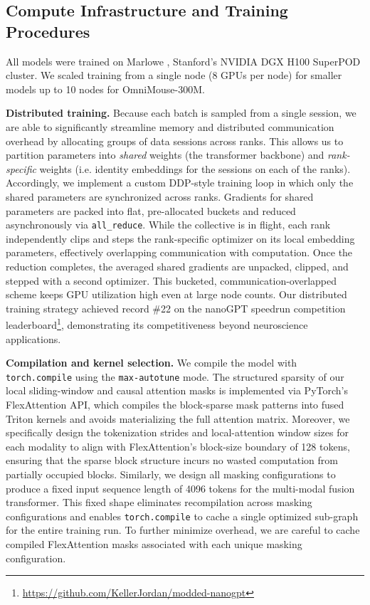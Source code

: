 \documentclass{article} %
\begin{document}

\subsection{Compute Infrastructure and Training Procedures}
\label{sec:appendix_compute}

All models were trained on Marlowe \citep{Marlowe}, Stanford's NVIDIA DGX H100 SuperPOD cluster. We scaled training from a single node (8 GPUs per node) for smaller models up to 10 nodes for OmniMouse-300M.

\textbf{Distributed training.}
Because each batch is sampled from a single session, we are able to significantly streamline memory and distributed communication overhead by allocating groups of data sessions across ranks. This allows us to partition parameters into \textit{shared} weights (the transformer backbone) and \textit{rank-specific} weights (i.e. identity embeddings for the sessions on each of the ranks). Accordingly, we implement a custom DDP-style training loop in which only the shared parameters are synchronized across ranks. Gradients for shared parameters are packed into flat, pre-allocated buckets and reduced asynchronously via \texttt{all\_reduce}. While the collective is in flight, each rank independently clips and steps the rank-specific optimizer on its local embedding parameters, effectively overlapping communication with computation. Once the reduction completes, the averaged shared gradients are unpacked, clipped, and stepped with a second optimizer. This bucketed, communication-overlapped scheme keeps GPU utilization high even at large node counts.  Our distributed training strategy achieved record \#22 on the nanoGPT speedrun \citep{modded_nanogpt_2024} competition  leaderboard\footnote{\url{https://github.com/KellerJordan/modded-nanogpt}}, demonstrating its competitiveness beyond neuroscience applications.

\textbf{Compilation and kernel selection.}
We compile the model with \texttt{torch.compile} using the \texttt{max-autotune} mode. The structured sparsity of our local sliding-window and causal attention masks is implemented via PyTorch's FlexAttention API, which compiles the block-sparse mask patterns into fused Triton kernels and avoids materializing the full attention matrix. Moreover, we specifically design the tokenization strides and local-attention window sizes for each modality to align with FlexAttention's block-size boundary of 128 tokens, ensuring that the sparse block structure incurs no wasted computation from partially occupied blocks. Similarly, we design all masking configurations to produce a fixed input sequence length of 4096 tokens for the multi-modal fusion transformer. This fixed shape eliminates recompilation across masking configurations and enables \texttt{torch.compile} to cache a single optimized sub-graph for the entire training run. To further minimize overhead, we are careful to cache compiled FlexAttention masks associated with each unique masking configuration. 
\end{document}
